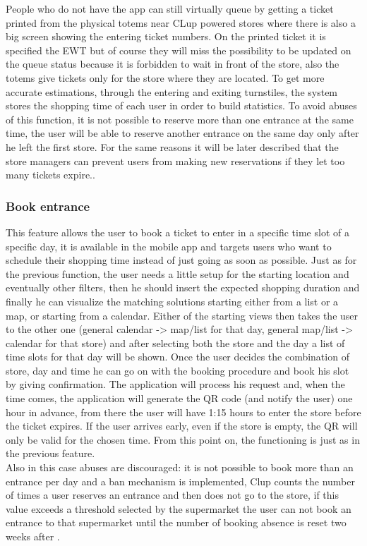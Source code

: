 People who do not have the app can still virtually queue by getting a ticket printed from the physical totems near CLup powered stores where there is also a big screen showing the entering ticket numbers. On the printed ticket it is specified the EWT but of course they will miss the possibility to be updated on the queue status because it is forbidden to wait in front of the store, also the totems give tickets only for the store where they are located.
To get more accurate estimations, through the entering and exiting turnstiles, the system stores the shopping time of each user in order to build statistics. 
To avoid abuses of this function, it is not possible to reserve more than one entrance at the same time, the user will be able to reserve another entrance on the same day only after he left the first store. For the same reasons it will be later described that the store managers can prevent users from making new reservations if they let too many tickets expire..


\subsubsection{Book entrance}
This feature allows the user to book a ticket to enter in a specific time slot of a specific day, it is available in the mobile app and targets users who want to schedule their shopping time instead of just going as soon as possible. Just as for the previous function, the user needs a little setup for the starting location and eventually other filters, then he should insert the expected shopping duration and finally he can visualize the matching solutions starting either from a list or a map, or starting from a calendar. Either of the starting views then takes the user to the other one (general calendar -> map/list for that day,  general map/list -> calendar for that store) and after selecting both the store and the day a list of time slots for that day will be shown. Once the user decides the combination of store, day and time he can go on with the booking procedure and book his slot by giving confirmation. The application will process his request and, when the time comes, the application will generate the QR code (and notify the user) one hour in advance, from there the user will have 1:15 hours to enter the store before the ticket expires. If the user arrives early, even if the store is empty, the QR will only be valid for the chosen time. From this point on, the functioning is just as in the previous feature.\\
Also in this case abuses are discouraged: it is not possible to book more than an entrance per day and a ban mechanism is implemented, Clup counts the number of times a user reserves an entrance and then does not go to the store, if this value exceeds a threshold selected by the supermarket the user can not book an entrance to that supermarket until the number of booking absence is reset two weeks after  .

